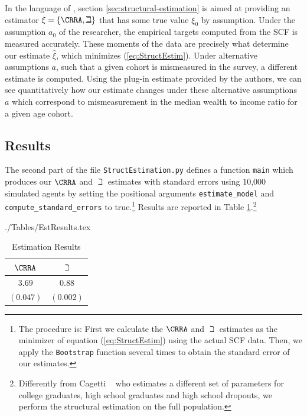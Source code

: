 \documentclass[SolvingMicroDSOPs]{subfiles}
\begin{document}
In the language of \cite{andrews2017measuring}, section \ref{sec:structural-estimation} is aimed at providing an estimator $\xi =\{\CRRA ,\beth\}$ that has some true value $\xi_0 $ by assumption. Under the assumption $a_0$ of the researcher, the empirical targets computed from the SCF is measured accurately. These moments of the data are precisely what determine our estimate $\hat{\xi}$, which minimizes (\ref{eq:StructEstim}). Under alternative assumptions $a$, such that a given cohort is mismeasured in the survey, a different estimate is computed. Using the plug-in estimate provided by the authors, we can see quantitatively how our estimate changes under these alternative assumptions $a$ which correspond to mismeasurement in the median wealth to income ratio for a given age cohort.

\hypertarget{estimation-results}{}
\subsection{Results}
The second part of the file \texttt{StructEstimation.py}
defines a function \texttt{main} which produces our $\CRRA$ and
$\beth$ estimates with standard errors using 10,000 simulated
agents by setting the positional arguments \texttt{estimate\_model} and
\texttt{compute\_standard\_errors} to true.\footnote{The procedure is: First we calculate the $\CRRA$ and
  $\beth$ estimates as the minimizer of equation
  (\ref{eq:StructEstim}) using the actual SCF data. Then, we apply the
  \texttt{Bootstrap} function several times to obtain the standard
  error of our estimates.} Results are reported in Table
\ref{tab:EstResults}.\footnote{Differently from Cagetti
  ~\citeyearpar{cagettiWprofiles} who estimates a different set of
  parameters for college graduates, high school graduates and high
  school dropouts, we perform the structural estimation on
  the full population.}


\begin{verbatimwrite}{./Tables/EstResults.tex}
  \begin{table}[h]
    \caption{Estimation Results}\label{tab:EstResults}
    \center
    \begin{tabular}{cc}
      \hline
      $\CRRA $ & $\beth$\\
      \hline
      $3.69$ & $0.88$\\
      $(0.047)$ & $(0.002)$\\
      \hline
    \end{tabular}
  \end{table}
\end{verbatimwrite}
\unskip
\unskip
\end{document}
